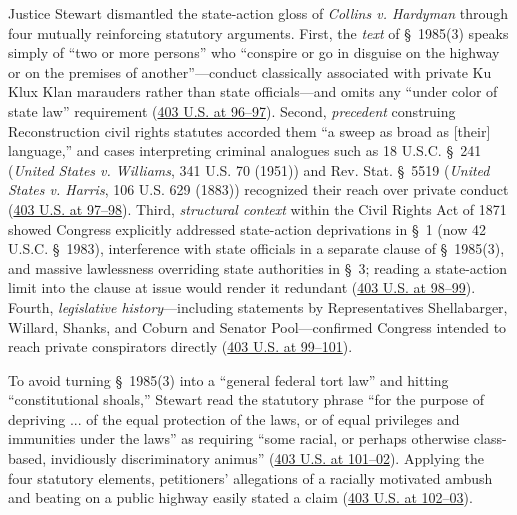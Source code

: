 \documentclass[12pt]{article}
\begin{document}
Justice Stewart dismantled the state-action gloss of \textit{Collins v. Hardyman} through four mutually reinforcing statutory arguments. First, the \textit{text} of \S~1985(3) speaks simply of ``two or more persons'' who ``conspire or go in disguise on the highway or on the premises of another''---conduct classically associated with private Ku Klux Klan marauders rather than state officials---and omits any ``under color of state law'' requirement (\href{https://supreme.justia.com/cases/federal/us/403/88/}{403 U.S. at 96--97}). Second, \textit{precedent} construing Reconstruction civil rights statutes accorded them ``a sweep as broad as [their] language,'' and cases interpreting criminal analogues such as 18 U.S.C. \S~241 (\textit{United States v. Williams}, 341 U.S. 70 (1951)) and Rev. Stat. \S~5519 (\textit{United States v. Harris}, 106 U.S. 629 (1883)) recognized their reach over private conduct (\href{https://supreme.justia.com/cases/federal/us/403/88/}{403 U.S. at 97--98}). Third, \textit{structural context} within the Civil Rights Act of 1871 showed Congress explicitly addressed state-action deprivations in \S~1 (now 42 U.S.C. \S~1983), interference with state officials in a separate clause of \S~1985(3), and massive lawlessness overriding state authorities in \S~3; reading a state-action limit into the clause at issue would render it redundant (\href{https://supreme.justia.com/cases/federal/us/403/88/}{403 U.S. at 98--99}). Fourth, \textit{legislative history}---including statements by Representatives Shellabarger, Willard, Shanks, and Coburn and Senator Pool---confirmed Congress intended to reach private conspirators directly (\href{https://supreme.justia.com/cases/federal/us/403/88/}{403 U.S. at 99--101}).

To avoid turning \S~1985(3) into a ``general federal tort law'' and hitting ``constitutional shoals,'' Stewart read the statutory phrase ``for the purpose of depriving ... of the equal protection of the laws, or of equal privileges and immunities under the laws'' as requiring ``some racial, or perhaps otherwise class-based, invidiously discriminatory animus'' (\href{https://supreme.justia.com/cases/federal/us/403/88/}{403 U.S. at 101--02}). Applying the four statutory elements, petitioners' allegations of a racially motivated ambush and beating on a public highway easily stated a claim (\href{https://supreme.justia.com/cases/federal/us/403/88/}{403 U.S. at 102--03}).
\end{document}
